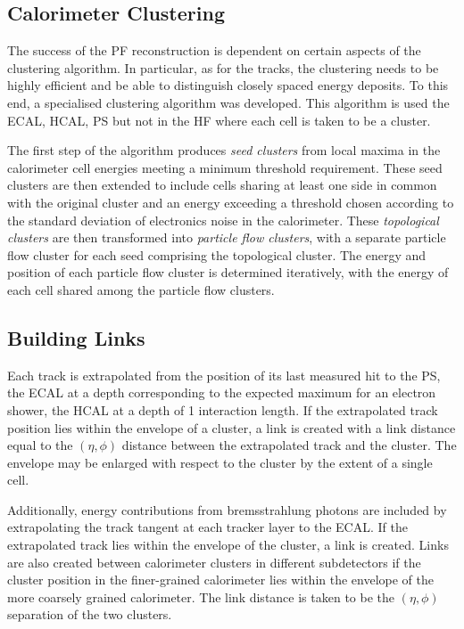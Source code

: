 \subsection{Calorimeter Clustering}
The success of the \ac{PF} reconstruction is dependent on certain aspects of the
clustering algorithm. In particular, as for the tracks, the clustering needs to
be highly efficient and be able to distinguish closely spaced energy deposits.
To this end, a specialised clustering algorithm was developed. This algorithm is
used the \ac{ECAL}, \ac{HCAL}, \ac{PS} but not in the \ac{HF} where each cell is
taken to be a cluster.

The first step of the algorithm produces \emph{seed clusters} from local maxima
in the calorimeter cell energies meeting a minimum threshold requirement.  These
seed clusters are then extended to include cells sharing at least one side in
common with the original cluster and an energy exceeding a threshold chosen
according to the standard deviation of electronics noise in the
calorimeter. These \emph{topological clusters} are then transformed into
\emph{particle flow clusters}, with a separate particle flow cluster for each
seed comprising the topological cluster. The energy and position of each
particle flow cluster is determined iteratively, with the energy of each cell
shared among the particle flow clusters.

\subsection{Building Links}
Each track is extrapolated from the position of its last measured hit to the
\ac{PS}, the \ac{ECAL} at a depth corresponding to the expected maximum for an
electron shower, the \ac{HCAL} at a depth of 1 interaction length. If the
extrapolated track position lies within the envelope of a cluster, a link is
created with a link distance equal to the $(\eta, \phi)$ distance between the
extrapolated track and the cluster. The envelope may be enlarged with respect to
the cluster by the extent of a single cell.

Additionally, energy contributions from bremsstrahlung photons are included by
extrapolating the track tangent at each tracker layer to the \ac{ECAL}. If the
extrapolated track lies within the envelope of the cluster, a link is created.
Links are also created between calorimeter clusters in different subdetectors if
the cluster position in the finer-grained calorimeter lies within the envelope
of the more coarsely grained calorimeter. The link distance is taken to be the
$(\eta, \phi)$ separation of the two clusters.

